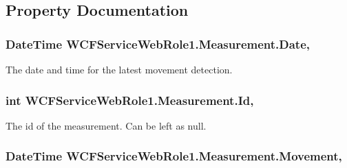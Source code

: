 \subsection{Property Documentation}
\hypertarget{class_w_c_f_service_web_role1_1_1_measurement_a40c9b7acb1a4bf2fe9b1a76cb3b0bfb1}{}
\subsubsection[{Date}]{\setlength{\rightskip}{0pt plus 5cm}Date\+Time W\+C\+F\+Service\+Web\+Role1.\+Measurement.\+Date\hspace{0.3cm}{\ttfamily [get]}, {\ttfamily [set]}}\label{class_w_c_f_service_web_role1_1_1_measurement_a40c9b7acb1a4bf2fe9b1a76cb3b0bfb1}


The date and time for the latest movement detection. 

\hypertarget{class_w_c_f_service_web_role1_1_1_measurement_a80bef1e085de826a7c693516b912c136}{}
\subsubsection[{Id}]{\setlength{\rightskip}{0pt plus 5cm}int W\+C\+F\+Service\+Web\+Role1.\+Measurement.\+Id\hspace{0.3cm}{\ttfamily [get]}, {\ttfamily [set]}}\label{class_w_c_f_service_web_role1_1_1_measurement_a80bef1e085de826a7c693516b912c136}


The id of the measurement. Can be left as null. 

\hypertarget{class_w_c_f_service_web_role1_1_1_measurement_a7adec3362734460f2f2106401f496c41}{}
\subsubsection[{Movement}]{\setlength{\rightskip}{0pt plus 5cm}Date\+Time W\+C\+F\+Service\+Web\+Role1.\+Measurement.\+Movement\hspace{0.3cm}{\ttfamily [get]}, {\ttfamily [set]}}\label{class_w_c_f_service_web_role1_1_1_measurement_a7adec3362734460f2f2106401f496c41}


